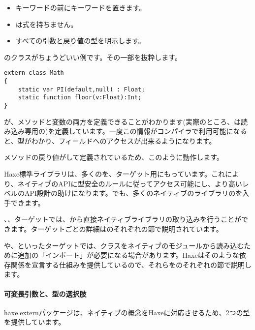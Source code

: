 \begin{itemize}
	\item {}キーワードの前にキーワードを置きます。
	\item {}は式を持ちません。
	\item すべての引数と戻り値の型を明示します。
\end{itemize}

のクラスがちょうどいい例です。その一部を抜粋します。

\begin{lstlisting}
extern class Math
{
	static var PI(default,null) : Float;
	static function floor(v:Float):Int;
}
\end{lstlisting}

が、メソッドと変数の両方を定義できることがわかります(実際のところ、は読み込み専用の)を定義しています。一度この情報がコンパイラで利用可能になると、型がわかり、フィールドへのアクセスが出来るようになります。


メソッドの戻り値がして定義されているため、このように動作します。

Haxe標準ライブラリは、多くのを、ターゲット用にもっています。これにより、ネイティブのAPIに型安全のルールに従ってアクセス可能にし、より高いレベルのAPI設計の助けになります。でも、多くのネイティブのライブラリのを入手できます。

、、ターゲットでは、から直接ネイティブライブラリの取り込みを行うことができます。ターゲットごとの詳細はのそれぞれの節で説明されています。

や、といったターゲットでは、クラスをネイティブのモジュールから読み込むために追加の「インポート」が必要になる場合があります。Haxeはそのような依存関係を宣言する仕組みを提供しているので、それらをのそれぞれの節で説明します。

\paragraph{可変長引数と、型の選択肢}

haxe.externパッケージは、ネイティブの概念をHaxeに対応させるため、2つの型を提供しています。

